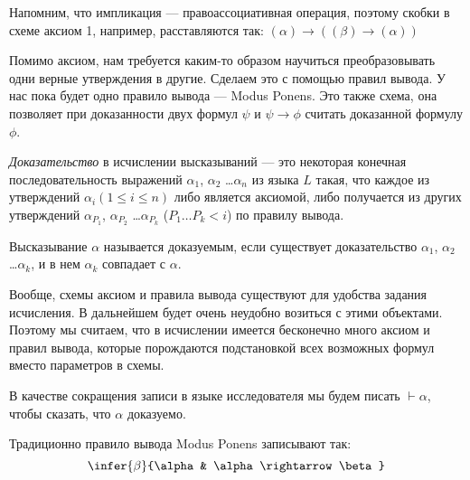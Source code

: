 Напомним, что импликация --- правоассоциативная операция, поэтому
скобки в схеме аксиом 1, например, расставляются так:
$(\alpha) \rightarrow ((\beta) \rightarrow (\alpha))$

Помимо аксиом, нам требуется каким-то образом научиться преобразовывать одни верные утверждения
в другие.
Сделаем это с помощью правил вывода. У нас пока будет одно правило вывода --- Modus Ponens.
Это также схема, она позволяет при доказанности двух формул $\psi$ и $\psi \rightarrow \phi$
считать доказанной формулу $\phi$.

\begin{definition} \emph{Доказательство} в исчислении высказываний --- 
это некоторая конечная последовательность выражений 
$\alpha_1$, $\alpha_2$ \dots $\alpha_n$
из языка $L$ такая, что каждое из утверждений $\alpha_i (1 \le i \le n)$
либо является аксиомой, либо получается из других
утверждений $\alpha_{P_1}$, $\alpha_{P_2}$ \dots $\alpha_{P_k}$ 
($P_1 \dots P_k < i$) по правилу вывода.
\end{definition}

\begin{definition} Высказывание $\alpha$ называется доказуемым, если 
существует доказательство $\alpha_1$, $\alpha_2$ \dots $\alpha_k$, и в нем
$\alpha_k$ совпадает с $\alpha$. 
\end{definition}

Вообще, схемы аксиом и правила вывода существуют для удобства задания
исчисления. В дальнейшем будет очень неудобно возиться с этими объектами.
Поэтому мы считаем, что в исчислении имеется бесконечно много аксиом и правил вывода,
которые порождаются подстановкой всех возможных формул вместо параметров в схемы.

В качестве сокращения записи в языке исследователя мы будем писать $\vdash \alpha$,
чтобы сказать, что $\alpha$ доказуемо.

Традиционно правило вывода Modus Ponens записывают так:
$$\infer{\beta}{\alpha & \alpha \rightarrow \beta}$$
